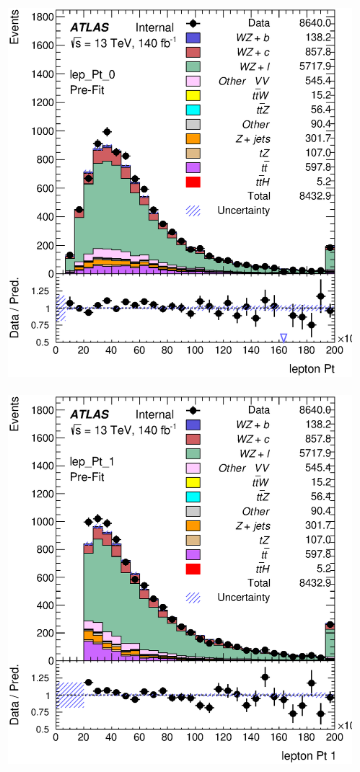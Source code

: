 \documentclass[NOTE, atlasdraft=true, texlive=2016, UKenglish]{\ATLASLATEXPATH atlasdoc}
\begin{document}
\begin{figure}[H]
    \begin{subfigure}{.48\textwidth}
        \includegraphics[width=1\linewidth]{kinematics/lep_Pt_0.eps}
        \caption{}
        \label{fig:lep_Pt_0}
    \end{subfigure}%
    \begin{subfigure}{.48\textwidth}
        \includegraphics[width=1\linewidth]{kinematics/lep_Pt_1.eps}

\end{subfigure}
\end{figure}
\end{document}
